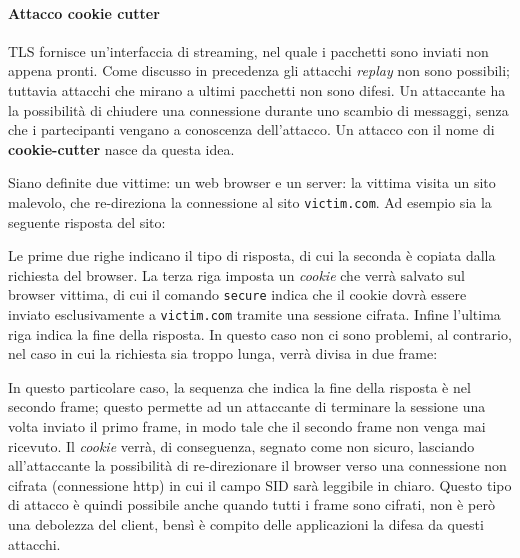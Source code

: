 \paragraph{Attacco cookie cutter}
TLS fornisce un'interfaccia di streaming, nel quale i pacchetti sono inviati non appena pronti. Come discusso in precedenza gli attacchi \emph{replay} non sono possibili; tuttavia attacchi che mirano a ultimi pacchetti non sono difesi. Un attaccante ha la possibilità di chiudere una connessione durante uno scambio di messaggi, senza che i partecipanti vengano a conoscenza dell'attacco. Un attacco con il nome di \textbf{cookie-cutter} nasce da questa idea.

\vspace{1em}
Siano definite due vittime: un web browser e un server: la vittima visita un sito malevolo, che re-direziona la connessione al sito \texttt{victim.com}. Ad esempio sia la seguente risposta del sito:



Le prime due righe indicano il tipo di risposta, di cui la seconda è copiata dalla richiesta del browser. La terza riga imposta un \emph{cookie} che verrà salvato sul browser vittima, di cui il comando \texttt{secure} indica che il cookie dovrà essere inviato esclusivamente a \texttt{victim.com} tramite una sessione cifrata. Infine l'ultima riga indica la fine della risposta. In questo caso non ci sono problemi, al contrario, nel caso in cui la richiesta sia troppo lunga, verrà divisa in due frame: 


In questo particolare caso, la sequenza che indica la fine della risposta è nel secondo frame; questo permette ad un attaccante di terminare la sessione una volta inviato il primo frame, in modo tale che il secondo frame non venga mai ricevuto. Il \emph{cookie} verrà, di conseguenza, segnato come non sicuro, lasciando all'attaccante la possibilità di re-direzionare il browser verso una connessione non cifrata (connessione http) in cui il campo SID sarà leggibile in chiaro. Questo tipo di attacco è quindi possibile anche quando tutti i frame sono cifrati, non è però una debolezza del client, bensì è compito delle applicazioni la difesa da questi attacchi. 

